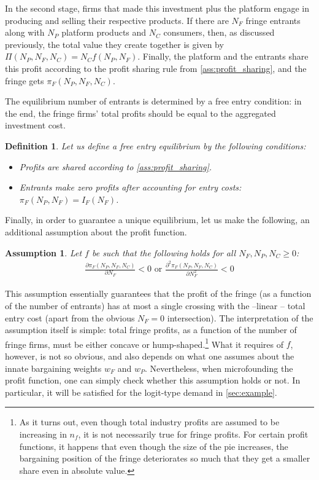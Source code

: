 \documentclass[a4paper]{article}
\newtheorem{definition}{Definition}
\newtheorem{assumption}{Assumption}
\begin{document}
In the second stage, firms that made this investment plus the platform engage in producing and selling their respective products.
If there are $N_F$ fringe entrants along with $N_P$ platform products and $N_C$ consumers, then, as discussed previously, the total value they create together is given by $\Pi(N_P, N_F, N_C) = N_C f(N_P, N_F)$.
Finally, the platform and the entrants share this profit according to the profit sharing rule from \cref{ass:profit_sharing}, and the fringe gets $\pi_F(N_P, N_F, N_C)$.

The equilibrium number of entrants is determined by a free entry condition: in the end, the fringe firms' total profits should be equal to the aggregated investment cost.
\begin{definition}
    \label{ass:free_entry}
    Let us define a free entry equilibrium by the following conditions:
    \begin{itemize}
        \item Profits are shared according to \cref{ass:profit_sharing}.
        \item Entrants make zero profits after accounting for entry costs: $\pi_F(N_P, N_F) = I_F(N_F)$.
    \end{itemize}
\end{definition}

Finally, in order to guarantee a unique equilibrium, let us make the following, an additional assumption about the profit function.
\begin{assumption}
    \label{ass:single_crossing}
    Let $f$ be such that the following holds for all $N_F, N_P, N_C \geq 0$:
    \begin{align*}
        \frac{\partial \pi_F(N_P, N_F, N_C)}{\partial N_F} < 0 \text{ or } \frac{\partial^2 \pi_F(N_P, N_F, N_C)}{\partial N_F^2} < 0
    \end{align*}
\end{assumption}
This assumption essentially guarantees that the profit of the fringe (as a function of the number of entrants) has at most a single crossing with the --linear -- total entry cost (apart from the obvious $N_F=0$ intersection).
The interpretation of the assumption itself is simple: total fringe profits, as a function of the number of fringe firms, must be either concave or hump-shaped.\footnote{
    As it turns out, even though total industry profits are assumed to be increasing in $n_f$, it is not necessarily true for fringe profits.
    For certain profit functions, it happens that even though the size of the pie increases, the bargaining position of the fringe deteriorates so much that they get a smaller share even in absolute value.
}
What it requires of $f$, however, is not so obvious, and also depends on what one assumes about the innate bargaining weights $w_F$ and $w_P$.
Nevertheless, when microfounding the profit function, one can simply check whether this assumption holds or not.
In particular, it will be satisfied for the logit-type demand in \cref{sec:example}.
\end{document}
